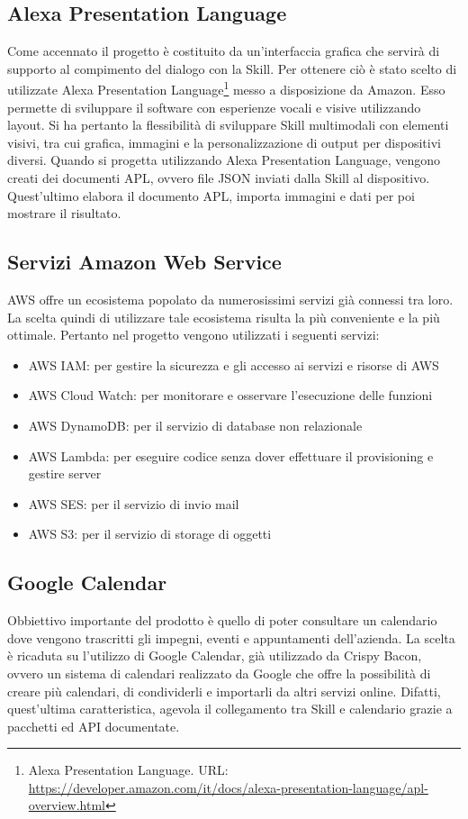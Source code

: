 \subsection{Alexa Presentation Language}
Come accennato il progetto è costituito da un'interfaccia grafica che servirà di supporto al compimento del dialogo con la Skill. Per ottenere ciò è stato scelto di utilizzate Alexa Presentation Language\footnote{Alexa Presentation Language. URL: \href{https://developer.amazon.com/it/docs/alexa-presentation-language/apl-overview.html}{https://developer.amazon.com/it/docs/alexa-presentation-language/apl-overview.html}} messo a disposizione da Amazon. Esso permette di sviluppare il software con esperienze vocali e visive utilizzando layout. Si ha pertanto la flessibilità di sviluppare Skill multimodali con elementi visivi, tra cui grafica, immagini e la personalizzazione di output per dispositivi diversi. Quando si progetta utilizzando Alexa Presentation Language, vengono creati dei documenti APL, ovvero file JSON inviati dalla Skill al dispositivo. Quest'ultimo elabora il documento APL, importa immagini e dati per poi mostrare il risultato.

\subsection{Servizi Amazon Web Service}
\label{serivizi-aws}
AWS offre un ecosistema popolato da numerosissimi servizi già connessi tra loro. La scelta quindi di utilizzare tale ecosistema risulta la più conveniente e la più ottimale. Pertanto nel progetto vengono utilizzati i seguenti servizi:
\begin{itemize}
    \item AWS IAM: per gestire la sicurezza e gli accesso ai servizi e risorse di AWS
    \item AWS Cloud Watch: per monitorare e osservare l'esecuzione delle funzioni
    \item AWS DynamoDB: per il servizio di database non relazionale 
    \item AWS Lambda: per eseguire codice senza dover effettuare il provisioning e gestire server
    \item AWS SES: per il servizio di invio mail 
    \item AWS S3: per il servizio di storage di oggetti 
\end{itemize}

\subsection{Google Calendar}
Obbiettivo importante del prodotto è quello di poter consultare un calendario dove vengono trascritti gli impegni, eventi e appuntamenti dell'azienda. La scelta è ricaduta su l'utilizzo di Google Calendar, già utilizzado da Crispy Bacon, ovvero un sistema di calendari realizzato da Google che offre la possibilità di creare più calendari, di condividerli e importarli da altri servizi online. Difatti, quest'ultima caratteristica, agevola il collegamento tra Skill e calendario grazie a pacchetti ed API documentate.

